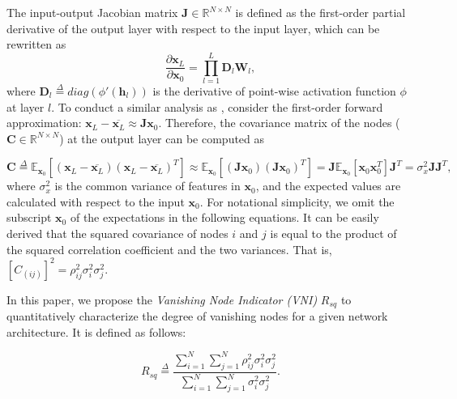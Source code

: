 The input-output Jacobian matrix $\mathbf{J}\in\mathbb{R}^{N\times N}$  is defined as the first-order partial derivative of the output layer with respect to the input layer, which can be rewritten as
\begin{equation}
    \frac{\partial\mathbf{x}_L}{\partial\mathbf{x}_0}=\prod_{l=1}^{L}\mathbf{D}_l\mathbf{W}_l,
    \label{jacobian_eqn}
\end{equation}
where $\mathbf{D}_l\overset{\Delta}{=} diag(\phi'(\mathbf{h}_l))$ is the derivative of point-wise activation function $\phi$ at layer $l$.
To conduct a similar analysis as \cite{mft:linear}, consider the first-order forward approximation:
$\mathbf{x}_L-\overline{\mathbf{x}_L} \approx \mathbf{Jx}_0$. Therefore, the covariance matrix of the nodes ($\mathbf{C}\in\mathbb{R}^{N\times N}$) at the output layer  can be computed as

\begin{equation}
    \mathbf{C} \overset{\Delta}{=}
    \mathbb{E}_{\mathbf{x}_0}[(\mathbf{x}_L-\overline{\mathbf{x}_L})(\mathbf{x}_L-\overline{\mathbf{x}_L})^T]
    \approx
    \mathbb{E}_{\mathbf{x}_0}[(\mathbf{Jx}_0)(\mathbf{Jx}_0)^T]
    =
    \mathbf{J}\mathbb{E}_{\mathbf{x}_0}[\mathbf{x}_0\mathbf{x}_0^T]\mathbf{J}^T
    =
    \sigma_x^2\mathbf{J}\mathbf{J}^T,
    \label{covariance_eqn}
\end{equation}
where $\sigma_x^2$ is the common variance of features in $\mathbf{x}_0$, and the expected values are calculated with respect to the input $\mathbf{x}_0$. For notational simplicity, we omit the subscript $\mathbf{x}_0$ of the expectations in the following equations. 
It can be easily derived that the squared covariance of nodes $i$ and $j$ is equal to the product of the squared correlation coefficient and the two variances. That is, $[C_{(ij)}]^2=\rho_{ij}^2\sigma_i^2\sigma_j^2$.

In this paper, we propose the \textit{Vanishing Node Indicator (VNI)} $R_{sq}$ to quantitatively characterize the degree of vanishing nodes for a given network architecture. It is defined as follows:

\begin{equation}
    R_{sq}\overset{\Delta}{=}
    \frac{\sum_{i=1}^N\sum_{j=1}^N\rho_{ij}^2\sigma_i^2\sigma_j^2}
{\sum_{i=1}^N\sum_{j=1}^N\sigma_i^2\sigma_j^2}.
\label{rsq_def}
\end{equation}

